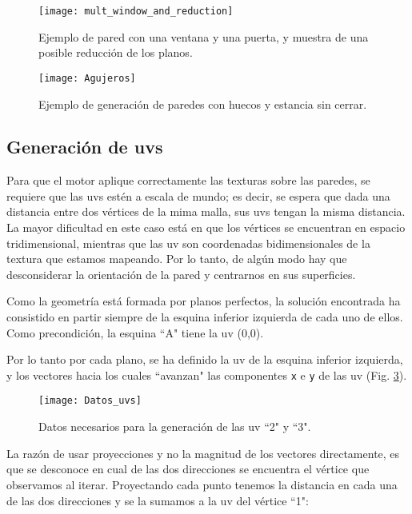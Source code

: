\begin{figure}[H]
    \centering
    \texttt{[image: mult\_window\_and\_reduction]}
    \caption{Ejemplo de pared con una ventana y una puerta, y muestra de una posible reducción de los planos.}
    \label{fig:mult_and_red_windows}
\end{figure}

\begin{figure}[H]
    \centering
    \texttt{[image: Agujeros]}
    \caption{Ejemplo de generación de paredes con huecos y estancia sin cerrar.}
    \label{fig:wall_with_window_example}
\end{figure}

\subsection{Generación de uvs}
Para que el motor aplique correctamente las texturas sobre las paredes, se requiere que las uvs estén a escala de mundo; es decir, se espera que dada una distancia entre dos vértices de la mima malla, sus uvs tengan la misma distancia. La mayor dificultad en este caso está en que los vértices se encuentran en espacio tridimensional, mientras que las uv son coordenadas bidimensionales de la textura que estamos mapeando. Por lo tanto, de algún modo hay que desconsiderar la orientación de la pared y centrarnos en sus superficies.

Como la geometría está formada por planos perfectos, la solución encontrada ha consistido en partir siempre de la esquina inferior izquierda de cada uno de ellos. Como precondición, la esquina ``A" tiene la uv (0,0).

Por lo tanto por cada plano, se ha definido la uv de la esquina inferior izquierda, y los vectores hacia los cuales ``avanzan" las componentes \texttt{x} e \texttt{y} de las uv (Fig. \ref{fig:datos_uvs}).

\begin{figure}[H]
    \centering
    \texttt{[image: Datos\_uvs]}
    \caption{Datos necesarios para la generación de las uv ``2" y ``3".}
    \label{fig:datos_uvs}
\end{figure}

La razón de usar proyecciones y no la magnitud de los vectores directamente, es que se desconoce en cual de las dos direcciones se encuentra el vértice que observamos al iterar. Proyectando cada punto tenemos la distancia en cada una de las dos direcciones y se la sumamos a la uv del vértice ``1":

